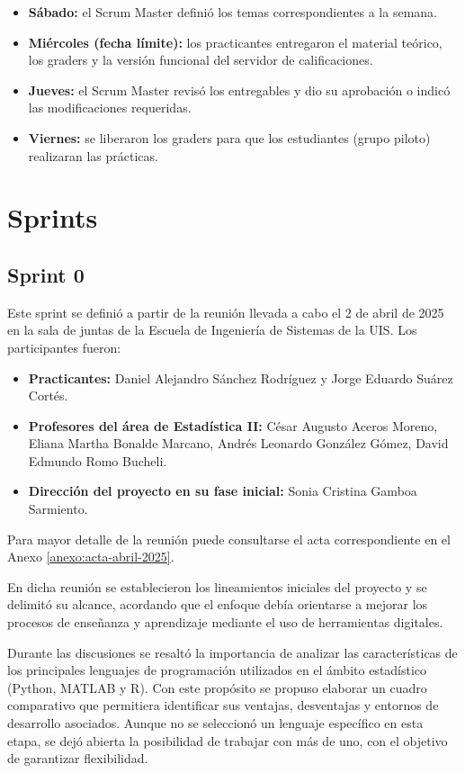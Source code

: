 \documentclass[letter,oneside,12pt,spanish]{report}
\begin{document}
\begin{itemize}
	\item \textbf{Sábado:} el Scrum Master definió los temas correspondientes a la semana.  
	\item \textbf{Miércoles (fecha límite):} los practicantes entregaron el material teórico, los graders y la versión funcional del servidor de calificaciones.  
	\item \textbf{Jueves:} el Scrum Master revisó los entregables y dio su aprobación o indicó las modificaciones requeridas.  
	\item \textbf{Viernes:} se liberaron los graders para que los estudiantes (grupo piloto) realizaran las prácticas.  
\end{itemize}

\section{Sprints}

\subsection{Sprint 0}

Este sprint se definió a partir de la reunión llevada a cabo el 2 de abril de 2025 en la sala de juntas de la Escuela de Ingeniería de Sistemas de la UIS. Los participantes fueron:

\begin{itemize}
	\item \textbf{Practicantes:} Daniel Alejandro Sánchez Rodríguez y Jorge Eduardo Suárez Cortés.
	\item \textbf{Profesores del área de Estadística II:} César Augusto Aceros Moreno, Eliana Martha Bonalde Marcano, Andrés Leonardo González Gómez, David Edmundo Romo Bucheli.
	\item \textbf{Dirección del proyecto en su fase inicial:} Sonia Cristina Gamboa Sarmiento.
\end{itemize}

\noindent Para mayor detalle de la reunión puede consultarse el acta correspondiente en el Anexo \ref{anexo:acta-abril-2025}.

En dicha reunión se establecieron los lineamientos iniciales del proyecto y se delimitó su alcance, acordando que el enfoque debía orientarse a mejorar los procesos de enseñanza y aprendizaje mediante el uso de herramientas digitales.  

Durante las discusiones se resaltó la importancia de analizar las características de los principales lenguajes de programación utilizados en el ámbito estadístico (Python, MATLAB y R). Con este propósito se propuso elaborar un cuadro comparativo que permitiera identificar sus ventajas, desventajas y entornos de desarrollo asociados. Aunque no se seleccionó un lenguaje específico en esta etapa, se dejó abierta la posibilidad de trabajar con más de uno, con el objetivo de garantizar flexibilidad.  
\end{document}
